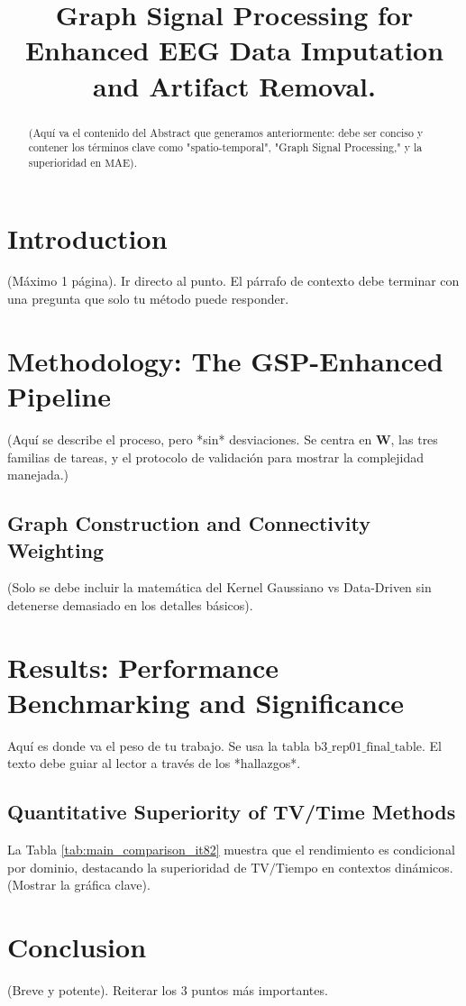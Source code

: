 \documentclass[conference]{IEEEtran} %
\title{Graph Signal Processing for Enhanced EEG Data Imputation and Artifact Removal.}
\author{\IEEEauthorblockN{Tu Nombre}
\IEEEauthorblockA{Your Department, Your University \\ \textit{your.email@uni.edu}}}
\begin{document}
\maketitle 

\begin{abstract}
(Aquí va el contenido del Abstract que generamos anteriormente: debe ser conciso y contener los términos clave como "spatio-temporal", "Graph Signal Processing," y la superioridad en $\text{MAE}$).
\end{abstract}

\section{Introduction}
(Máximo 1 página). Ir directo al punto. El párrafo de contexto debe terminar con una pregunta que solo tu método puede responder.

\section{Methodology: The GSP-Enhanced Pipeline}
(Aquí se describe el proceso, pero *sin* desviaciones. Se centra en $\mathbf{W}$, las tres familias de tareas, y el protocolo de validación para mostrar la complejidad manejada.) 

\subsection{Graph Construction and Connectivity Weighting}
(Solo se debe incluir la matemática del Kernel Gaussiano vs Data-Driven sin detenerse demasiado en los detalles básicos).


\section{Results: Performance Benchmarking and Significance}
Aquí es donde va el peso de tu trabajo. Se usa la tabla $\text{b3\_rep01_final\_table}$. El texto debe guiar al lector a través de los *hallazgos*.

\subsection{Quantitative Superiority of TV/Time Methods}
La Tabla \ref{tab:main_comparison_it82} muestra que el rendimiento es condicional por dominio, destacando la superioridad de $\text{TV/Tiempo}$ en contextos dinámicos. (Mostrar la gráfica clave).

\section{Conclusion}
(Breve y potente). Reiterar los 3 puntos más importantes.


 
\end{document}

